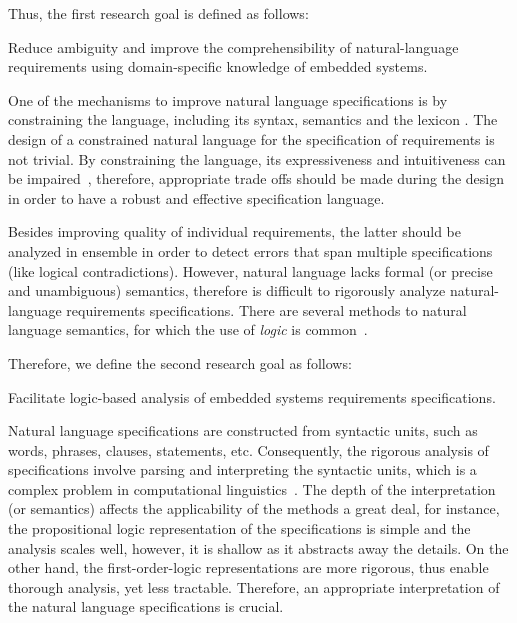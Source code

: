 Thus, the first research goal is defined as follows: 
\setcounter{rgcounter}{1}
\begin{researchgoal}
Reduce ambiguity and improve the comprehensibility of natural-language requirements using domain-specific knowledge of embedded systems.
\end{researchgoal}

One of the mechanisms to improve natural language specifications is by constraining the language, including its syntax, semantics and the lexicon \cite{Kuhn2014ALanguages}. The design of a constrained natural language for the specification of requirements is not trivial. By constraining the language, its expressiveness and intuitiveness can be impaired~\cite{ieereqspecstandard}\cite{Myachykov2013SyntacticRussian}, therefore, appropriate trade offs should be made during the design in order to have a robust and effective specification language.

Besides improving quality of individual requirements, the latter should be analyzed in ensemble in order to detect errors that span multiple specifications (like logical contradictions). However, natural language lacks formal (or precise and unambiguous) semantics, therefore is difficult to rigorously analyze natural-language requirements specifications. There are several methods to natural language semantics, for which the use of \textit{logic} is common~\cite{Clark2010TheProcessing}.

Therefore, we define the second research goal as follows: 
\begin{researchgoal}
Facilitate logic-based analysis of embedded systems requirements specifications.
\end{researchgoal}

Natural language specifications are constructed from syntactic units, such as words, phrases, clauses, statements, etc. Consequently, the rigorous analysis of specifications involve parsing and interpreting the syntactic units, which is a complex problem in computational linguistics~\cite{Clark2010TheProcessing}. The depth of the interpretation (or semantics) affects the applicability of the methods a great deal, for instance, the propositional logic representation of the specifications is simple and the analysis scales well, however, it is shallow as it abstracts away the details. On the other hand, the first-order-logic representations are more rigorous, thus enable thorough analysis, yet less tractable. Therefore, an appropriate interpretation of the natural language specifications is crucial.

